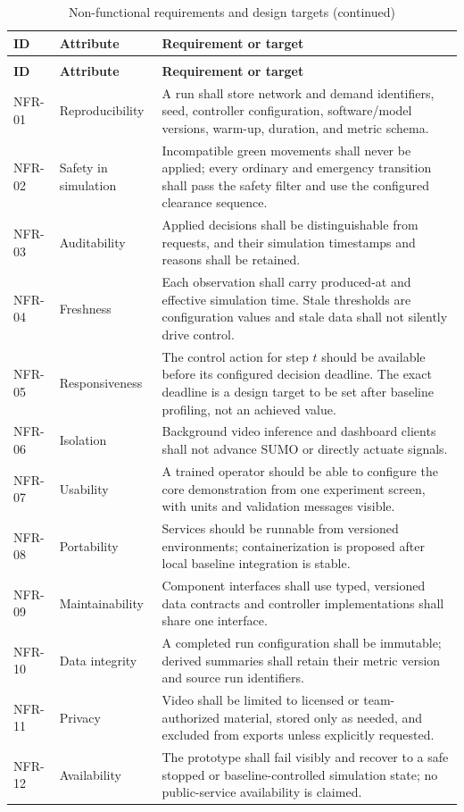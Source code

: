 \begin{longtable}{p{}p{}p{}}
\caption{Non-functional requirements and design targets}\label{tab:nfr}\\
\toprule
\textbf{ID} & \textbf{Attribute} & \textbf{Requirement or target}\\
\midrule\endfirsthead
\caption[]{Non-functional requirements and design targets (continued)}\\
\toprule
\textbf{ID} & \textbf{Attribute} & \textbf{Requirement or target}\\
\midrule\endhead
NFR-01 & Reproducibility & A run shall store network and demand identifiers, seed, controller configuration, software/model versions, warm-up, duration, and metric schema.\\
NFR-02 & Safety in simulation & Incompatible green movements shall never be applied; every ordinary and emergency transition shall pass the safety filter and use the configured clearance sequence.\\
NFR-03 & Auditability & Applied decisions shall be distinguishable from requests, and their simulation timestamps and reasons shall be retained.\\
NFR-04 & Freshness & Each observation shall carry produced-at and effective simulation time. Stale thresholds are configuration values and stale data shall not silently drive control.\\
NFR-05 & Responsiveness & The control action for step $t$ should be available before its configured decision deadline. The exact deadline is a design target to be set after baseline profiling, not an achieved value.\\
NFR-06 & Isolation & Background video inference and dashboard clients shall not advance SUMO or directly actuate signals.\\
NFR-07 & Usability & A trained operator should be able to configure the core demonstration from one experiment screen, with units and validation messages visible.\\
NFR-08 & Portability & Services should be runnable from versioned environments; containerization is proposed after local baseline integration is stable.\\
NFR-09 & Maintainability & Component interfaces shall use typed, versioned data contracts and controller implementations shall share one interface.\\
NFR-10 & Data integrity & A completed run configuration shall be immutable; derived summaries shall retain their metric version and source run identifiers.\\
NFR-11 & Privacy & Video shall be limited to licensed or team-authorized material, stored only as needed, and excluded from exports unless explicitly requested.\\
NFR-12 & Availability & The prototype shall fail visibly and recover to a safe stopped or baseline-controlled simulation state; no public-service availability is claimed.\\
\bottomrule
\end{longtable}

